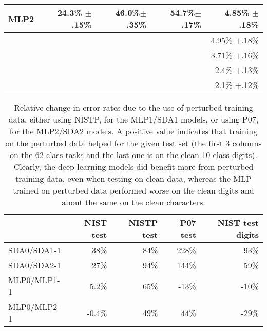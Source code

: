 \documentclass{article} %
\begin{document}
\begin{table}[ht]
\begin{center}
\begin{tabular}{|l|r|r|r|r|}
MLP2   &  24.3\% $\pm$.15\%  &  46.0\%$\pm$.35\%  & 54.7\%$\pm$.17\%  & 4.85\% $\pm$.18\% \\ \hline 
\citep{Granger+al-2007} &     &                    &                   & 4.95\% $\pm$.18\% \\ \hline
\citep{Cortes+al-2000} &      &                    &                   & 3.71\% $\pm$.16\% \\ \hline
\citep{Oliveira+al-2002} &    &                    &                   & 2.4\% $\pm$.13\% \\ \hline
\citep{Milgram+al-2005} &      &                    &                   & 2.1\% $\pm$.12\% \\ \hline
\end{tabular}
\end{center}
\end{table}

\begin{table}[ht]
\caption{Relative change in error rates due to the use of perturbed training data,
either using NISTP, for the MLP1/SDA1 models, or using P07, for the MLP2/SDA2 models.
A positive value indicates that training on the perturbed data helped for the
given test set (the first 3 columns on the 62-class tasks and the last one is
on the clean 10-class digits). Clearly, the deep learning models did benefit more
from perturbed training data, even when testing on clean data, whereas the MLP
trained on perturbed data performed worse on the clean digits and about the same
on the clean characters. }
\label{tab:perturbation-effect}
\begin{center}
\begin{tabular}{|l|r|r|r|r|} \hline
      & NIST test          & NISTP test      & P07 test       & NIST test digits   \\ \hline
SDA0/SDA1-1   &  38\%      &  84\%           & 228\%          &  93\% \\ \hline 
SDA0/SDA2-1   &  27\%      &  94\%           & 144\%          &  59\% \\ \hline 
MLP0/MLP1-1   &  5.2\%     &  65\%           & -13\%          & -10\%  \\ \hline 
MLP0/MLP2-1   &  -0.4\%    &  49\%           & 44\%           & -29\% \\ \hline 
\end{tabular}
\end{center}
\end{table}
\end{document}
